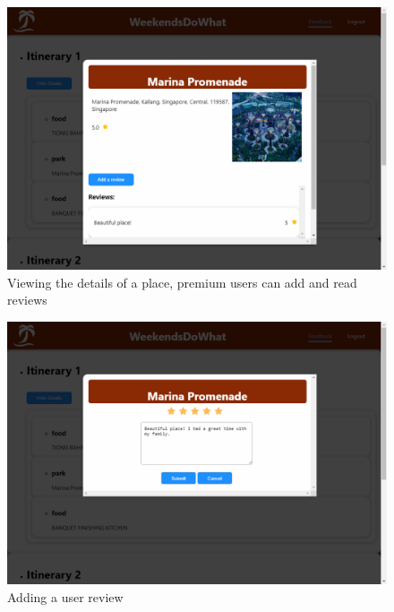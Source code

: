 \documentclass[12pt,a4paper]{article}
\begin{document}
\begin{appendix}
\begin{figure}[H]
	\centering
	\includegraphics[width=1\textwidth]{figures/ui-place-details.png}
	\caption{Viewing the details of a place, premium users can add and read reviews}
\end{figure}

\begin{figure}[H]
	\centering
	\includegraphics[width=1\textwidth]{figures/ui-add-review.png}
	\caption{Adding a user review}
\end{figure}
\end{appendix}
\end{document}
